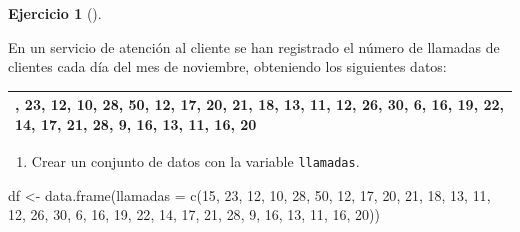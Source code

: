 \documentclass[
  a4paper,
]{scrreport}
\newenvironment{Shaded}{\begin{snugshade}}{\end{snugshade}}
\newcommand{\AttributeTok}[1]{\textcolor[rgb]{0.40,0.45,0.13}{#1}}
\newcommand{\DecValTok}[1]{\textcolor[rgb]{0.68,0.00,0.00}{#1}}
\newcommand{\FunctionTok}[1]{\textcolor[rgb]{0.28,0.35,0.67}{#1}}
\newcommand{\NormalTok}[1]{\textcolor[rgb]{0.00,0.23,0.31}{#1}}
\newcommand{\OtherTok}[1]{\textcolor[rgb]{0.00,0.23,0.31}{#1}}
\providecommand{\tightlist}{%
  \setlength{\itemsep}{0pt}\setlength{\parskip}{0pt}}\usepackage{longtable,booktabs,array}
\theoremstyle{definition}
\newtheorem{exercise}{Ejercicio}[chapter]
\theoremstyle{remark}
\begin{document}
\leavevmode{}%
\begin{exercise}[]\label{exr-2}

En un servicio de atención al cliente se han registrado el número de
llamadas de clientes cada día del mes de noviembre, obteniendo los
siguientes datos:

\begin{longtable}[]{@{}
  >{\centering\arraybackslash}p{}@{}}
\toprule()
\endhead
15, 23, 12, 10, 28, 50, 12, 17, 20, 21, 18, 13, 11, 12, 26, 30, 6, 16,
19, 22, 14, 17, 21, 28, 9, 16, 13, 11, 16, 20 \\
\bottomrule()
\end{longtable}

\begin{enumerate}
\def\labelenumi{\alph{enumi}.}
\tightlist
\item
  Crear un conjunto de datos con la variable \texttt{llamadas}.
\end{enumerate}

\begin{tcolorbox}[enhanced jigsaw, coltitle=black, breakable, bottomtitle=1mm, colbacktitle=quarto-callout-tip-color!10!white, rightrule=.15mm, opacityback=0, opacitybacktitle=0.6, left=2mm, colframe=quarto-callout-tip-color-frame, title=\textcolor{quarto-callout-tip-color}{\faLightbulb}\hspace{0.5em}{Solución}, toprule=.15mm, toptitle=1mm, arc=.35mm, colback=white, titlerule=0mm, bottomrule=.15mm, leftrule=.75mm]

\begin{Shaded}
\begin{Highlighting}[]
\NormalTok{df }\OtherTok{\textless{}{-}} \FunctionTok{data.frame}\NormalTok{(}\AttributeTok{llamadas =} \FunctionTok{c}\NormalTok{(}\DecValTok{15}\NormalTok{, }\DecValTok{23}\NormalTok{, }\DecValTok{12}\NormalTok{, }\DecValTok{10}\NormalTok{, }\DecValTok{28}\NormalTok{, }\DecValTok{50}\NormalTok{, }\DecValTok{12}\NormalTok{, }\DecValTok{17}\NormalTok{, }\DecValTok{20}\NormalTok{, }\DecValTok{21}\NormalTok{, }\DecValTok{18}\NormalTok{, }\DecValTok{13}\NormalTok{, }\DecValTok{11}\NormalTok{, }\DecValTok{12}\NormalTok{, }\DecValTok{26}\NormalTok{, }\DecValTok{30}\NormalTok{, }\DecValTok{6}\NormalTok{, }\DecValTok{16}\NormalTok{, }\DecValTok{19}\NormalTok{, }\DecValTok{22}\NormalTok{, }\DecValTok{14}\NormalTok{, }\DecValTok{17}\NormalTok{, }\DecValTok{21}\NormalTok{, }\DecValTok{28}\NormalTok{, }\DecValTok{9}\NormalTok{, }\DecValTok{16}\NormalTok{, }\DecValTok{13}\NormalTok{, }\DecValTok{11}\NormalTok{, }\DecValTok{16}\NormalTok{, }\DecValTok{20}\NormalTok{))}
\end{Highlighting}
\end{Shaded}


\end{tcolorbox}
\end{exercise}
\end{document}

